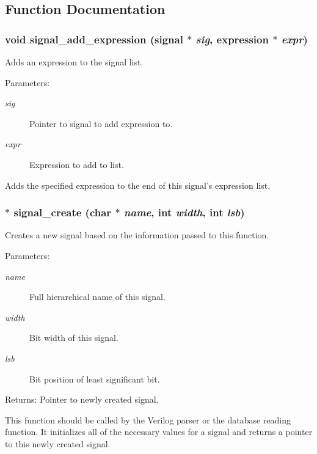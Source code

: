\subsection{Function Documentation}
\subsubsection{\setlength{\rightskip}{0pt plus 5cm}void signal\_\-add\_\-expression ({\bf signal} $\ast$ {\em sig}, {\bf expression} $\ast$ {\em expr})}\label{signal_8c_a10}


Adds an expression to the signal list. 

\begin{Desc}
\item[Parameters:]
\begin{description}
\item[{\em sig}]Pointer to signal to add expression to. \item[{\em expr}]Expression to add to list.\end{description}
\end{Desc}
Adds the specified expression to the end of this signal's expression list. 
\subsubsection{$\ast$ signal\_\-create (char $\ast$ {\em name}, int {\em width}, int {\em lsb})}\label{signal_8c_a3}


Creates a new signal based on the information passed to this function. 

\begin{Desc}
\item[Parameters:]
\begin{description}
\item[{\em name}]Full hierarchical name of this signal. \item[{\em width}]Bit width of this signal. \item[{\em lsb}]Bit position of least significant bit.\end{description}
\end{Desc}
\begin{Desc}
\item[Returns:]Pointer to newly created signal.\end{Desc}
This function should be called by the Verilog parser or the database reading function. It initializes all of the necessary values for a signal and returns a pointer to this newly created signal. 
